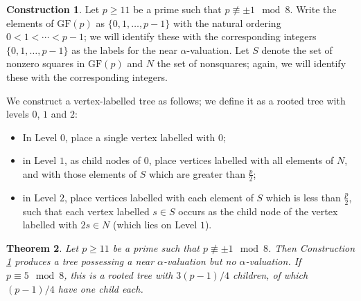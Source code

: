 \documentclass[12pt, a4paper]{article}
\newtheorem{theorem}{Theorem}[section]
\theoremstyle{definition}
\newtheorem{construction}[theorem]{Construction}
\begin{document}
\begin{construction}\label{constr:near alpha}
Let $p \geq 11$ be a prime such that $p \not \equiv \pm 1 \mod 8 $.  Write the elements of $\mathrm{GF}(p)$ as $\{0,1,\ldots,p-1\}$ with the natural ordering $0<1< \cdots < p-1$; we will identify these with the corresponding integers $\{0,1,\ldots,p-1\}$ as the labels for the near $\alpha$-valuation.  Let $S$ denote the set of nonzero squares in $\mathrm{GF}(p)$ and $N$ the set of nonsquares; again, we will identify these with the corresponding integers.

We construct a vertex-labelled tree as follows; we define it as a rooted tree with levels $0$, $1$ and $2$:
\begin{itemize}
\item[(i)] In Level $0$, place a single vertex labelled with $0$;
\item[(ii)] in Level $1$, as child nodes of $0$, place vertices labelled with all elements of $N$, and with those elements of $S$ which are greater than $\frac{p}{2}$;
\item[(iii)] in Level $2$, place vertices labelled with each element of $S$ which is less than $\frac{p}{2}$, such that each vertex labelled $s \in S$ occurs as the child node of the vertex labelled with $2s \in N$ (which lies on Level $1$).
\end{itemize}
\end{construction}

\begin{theorem}
Let $p \geq 11$ be a prime such that $p \not \equiv \pm 1 \mod 8 $.  
Then Construction \ref{constr:near alpha} produces a tree possessing a near $\alpha$-valuation but no $\alpha$-valuation. If $p \equiv 5 \mod 8$, this is a rooted tree with $3(p-1)/4$ children, of which $(p-1)/4$ have one child each.
\end{theorem}
\end{document}
